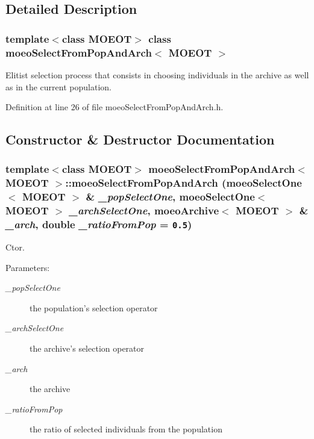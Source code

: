 \subsection{Detailed Description}
\subsubsection*{template$<$class MOEOT$>$ class moeo\-Select\-From\-Pop\-And\-Arch$<$ MOEOT $>$}

Elitist selection process that consists in choosing individuals in the archive as well as in the current population. 



Definition at line 26 of file moeo\-Select\-From\-Pop\-And\-Arch.h.

\subsection{Constructor \& Destructor Documentation}
\subsubsection{\setlength{\rightskip}{0pt plus 5cm}template$<$class MOEOT$>$ {\bf moeo\-Select\-From\-Pop\-And\-Arch}$<$ MOEOT $>$::{\bf moeo\-Select\-From\-Pop\-And\-Arch} ({\bf moeo\-Select\-One}$<$ MOEOT $>$ \& {\em \_\-pop\-Select\-One}, {\bf moeo\-Select\-One}$<$ MOEOT $>$ {\em \_\-arch\-Select\-One}, {\bf moeo\-Archive}$<$ MOEOT $>$ \& {\em \_\-arch}, double {\em \_\-ratio\-From\-Pop} = {\tt 0.5})\hspace{0.3cm}{\tt  [inline]}}\label{classmoeoSelectFromPopAndArch_96b34f67d678a7df7610f28bf10c4e86}


Ctor. 

\begin{Desc}
\item[Parameters:]
\begin{description}
\item[{\em \_\-pop\-Select\-One}]the population's selection operator \item[{\em \_\-arch\-Select\-One}]the archive's selection operator \item[{\em \_\-arch}]the archive \item[{\em \_\-ratio\-From\-Pop}]the ratio of selected individuals from the population \end{description}
\end{Desc}


